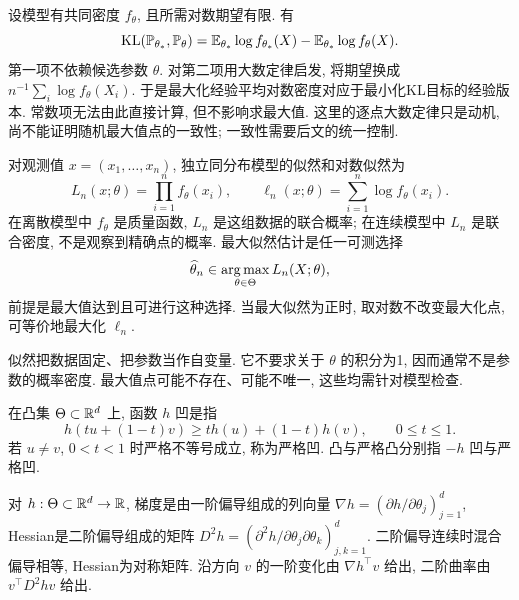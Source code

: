 设模型有共同密度 $f_\theta$, 且所需对数期望有限. 有
\[
 \operatorname{KL}(\mathbb P_{\theta_*},\mathbb P_\theta)
 =\mathbb E_{\theta_*}\log f_{\theta_*}(X)-\mathbb E_{\theta_*}\log f_\theta(X).
\]
第一项不依赖候选参数 $\theta$. 对第二项用大数定律启发, 将期望换成 $n^{-1}\sum_i\log f_\theta(X_i)$. 于是最大化经验平均对数密度对应于最小化KL目标的经验版本. 常数项无法由此直接计算, 但不影响求最大值. 这里的逐点大数定律只是动机, 尚不能证明随机最大值点的一致性; 一致性需要后文的统一控制.

\begin{definition}[似然与最大似然估计]
对观测值 $x=(x_1,\ldots,x_n)$, 独立同分布模型的似然和对数似然为
\[
 L_n(x;\theta)=\prod_{i=1}^nf_\theta(x_i),\qquad
 \ell_n(x;\theta)=\sum_{i=1}^n\log f_\theta(x_i).
\]
在离散模型中 $f_\theta$ 是质量函数, $L_n$ 是这组数据的联合概率; 在连续模型中 $L_n$ 是联合密度, 不是观察到精确点的概率. 最大似然估计是任一可测选择
\[
 \widehat\theta_n\in\operatorname*{arg\,max}_{\theta\in\Theta}L_n(X;\theta),
\]
前提是最大值达到且可进行这种选择. 当最大似然为正时, 取对数不改变最大化点, 可等价地最大化 $\ell_n$.
\end{definition}
似然把数据固定、把参数当作自变量. 它不要求关于 $\theta$ 的积分为1, 因而通常不是参数的概率密度. 最大值点可能不存在、可能不唯一, 这些均需针对模型检查.

\begin{definition}[凹函数]
在凸集 $\Theta\subset\mathbb R^d$ 上, 函数 $h$ 凹是指
\[
 h(tu+(1-t)v)\ge th(u)+(1-t)h(v),\qquad 0\le t\le1.
\]
若 $u\ne v$, $0<t<1$ 时严格不等号成立, 称为严格凹. 凸与严格凸分别指 $-h$ 凹与严格凹.
\end{definition}
对 $h:\Theta\subset\mathbb R^d\to\mathbb R$, 梯度是由一阶偏导组成的列向量 $\nabla h=(\partial h/\partial\theta_j)_{j=1}^d$, Hessian是二阶偏导组成的矩阵 $D^2h=(\partial^2h/\partial\theta_j\partial\theta_k)_{j,k=1}^d$. 二阶偏导连续时混合偏导相等, Hessian为对称矩阵. 沿方向 $v$ 的一阶变化由 $\nabla h^\top v$ 给出, 二阶曲率由 $v^\top D^2hv$ 给出.

